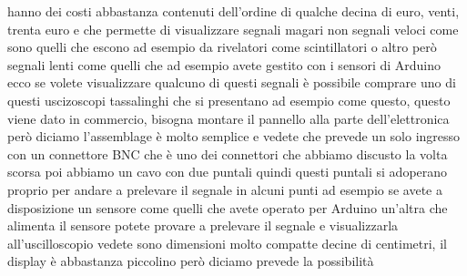 hanno dei costi abbastanza contenuti dell'ordine di qualche decina di euro, venti, trenta euro e che permette di visualizzare segnali magari non segnali veloci come sono quelli che escono ad esempio da rivelatori come scintillatori o altro però segnali lenti come quelli che ad esempio avete gestito con i sensori di Arduino ecco se volete visualizzare qualcuno di questi segnali è possibile comprare uno di questi uscizoscopi tassalinghi che si presentano ad esempio come questo, questo viene dato in commercio, bisogna montare il pannello alla parte dell'elettronica però diciamo l'assemblage è molto semplice e vedete che prevede un solo ingresso con un connettore BNC che è uno dei connettori che abbiamo discusto la volta scorsa poi abbiamo un cavo con due puntali quindi questi puntali si adoperano proprio per andare a prelevare il segnale in alcuni punti ad esempio se avete a disposizione un sensore come quelli che avete operato per Arduino un'altra che alimenta il sensore potete provare a prelevare il segnale e visualizzarla all'uscilloscopio vedete sono dimensioni molto compatte decine di centimetri, il display è abbastanza piccolino però diciamo prevede la possibilità 

